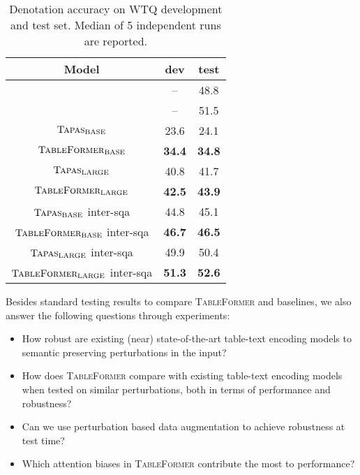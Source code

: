 \documentclass[11pt]{article}
\begin{document}
\begin{table}
\footnotesize
\centering
\begin{tabular}{ccc}
\toprule
  Model                                           & dev           & test          \\\midrule
\citet{herzig-etal-2020-tapas}                              & --             & 48.8          \\
\citet{eisenschlos2021mate} & --             & 51.5          \\\midrule
$\textsc{Tapas}_{\text{BASE}}$                                       & 23.6          & 24.1          \\
$\textsc{TableFormer}_{\text{BASE}}$                                  & \textbf{34.4} & \textbf{34.8} \\\midrule
$\textsc{Tapas}_{\text{LARGE}}$                                        & 40.8          & 41.7          \\
$\textsc{TableFormer}_{\text{LARGE}}$                                 & \textbf{42.5} & \textbf{43.9} \\\midrule
$\textsc{Tapas}_{\text{BASE}}$  inter-sqa                       & 44.8          & 45.1          \\
$\textsc{TableFormer}_{\text{BASE}}$ inter-sqa                 & \textbf{46.7} & \textbf{46.5} \\\midrule
$\textsc{Tapas}_{\text{LARGE}}$  inter-sqa                      & 49.9          & 50.4          \\
$\textsc{TableFormer}_{\text{LARGE}}$ inter-sqa                & \textbf{51.3} & \textbf{52.6}
\\\bottomrule
\end{tabular}
\caption{\label{tab:widgets3} Denotation accuracy on \textsc{WTQ} development and test set. Median of 5 independent runs are reported.}
\vspace{-2em}
\end{table}


Besides standard testing results to compare \textsc{TableFormer} and baselines, we also answer the following questions through experiments:
\begin{itemize}%
    \item How robust are existing (near) state-of-the-art table-text encoding models to semantic preserving perturbations in the input?
    \item How does \textsc{TableFormer} compare with existing table-text encoding models when tested on similar perturbations, both in terms of performance and robustness?
    \item Can we use perturbation based data augmentation to achieve robustness at test time?
    \item Which attention biases in \textsc{TableFormer} contribute the most to performance?
\end{itemize}
\end{document}
